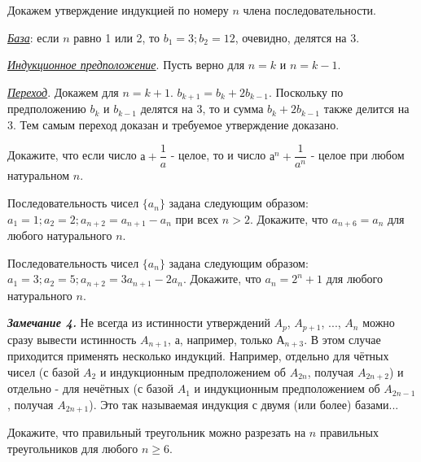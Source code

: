 \begin{prf}
Докажем утверждение индукцией по номеру $n$ члена последовательности.
\par
\textit{\underline{База}}: если $n$ равно 1 или 2, то $b_1 = 3; b_2 = 12$, очевидно, делятся на 3. 
\par
\textit{\underline{Индукционное предположение}}. Пусть верно для $n = k$ и $n = k - 1$.
\par
\textit{\underline{Переход}}. Докажем для $n = k + 1$. $b_{k + 1} = b_k + 2b_{k-1}$. Поскольку по предположению $b_k$ и $b_{k-1}$ делятся на 3, то и сумма $b_k + 2b_{k - 1}$ также делится на 3. Тем самым переход доказан и требуемое утверждение
доказано.
\end{prf}

\begin{thm}
Докажите, что если число $а + \dfrac{1}{a}$ - целое, то и число $а^n + \dfrac{1}{a^n}$ - целое при любом натуральном $n$.
\end{thm}

\begin{thm}
Последовательность чисел $\{a_n\}$ задана следующим образом: $a_1 = 1; a_2 = 2; a_{n + 2} = a_{n + 1} - a_{n}$ при всех $n > 2$. Докажите, что $a_{n + 6} = a_n$ для любого натурального $n$.
\end{thm}

\begin{thm}
Последовательность чисел $\{a_n\}$ задана следующим образом: $a_1 = 3; a_2 = 5; a_{n + 2} = 3a_{n + 1} - 2a_{n}$. Докажите, что $a_n = 2^n + 1$ для любого натурального $n$.
\end{thm}

\textbf{\textit{Замечание 4.}} Не всегда из истинности утверждений $A_p$, $A_{p + 1}$, ..., $A_n$ можно сразу вывести истинность $A_{n + 1}$, а, например, только $А_{n+3}$. В этом случае приходится применять несколько индукций. Например, отдельно для
чётных чисел (с базой $A_2$ и индукционным предположением об $A_{2n}$, получая $A_{2n+2}$) и отдельно - для нечётных
(с базой $A_1$ и индукционным предположением об $A_{2n-1}$, получая $A_{2n+1}$). Это так называемая индукция с двумя
(или более) базами...

\begin{thm}
Докажите, что правильный треугольник можно разрезать на $n$ правильных треугольников для любого $n \geq 6$.
\end{thm}

